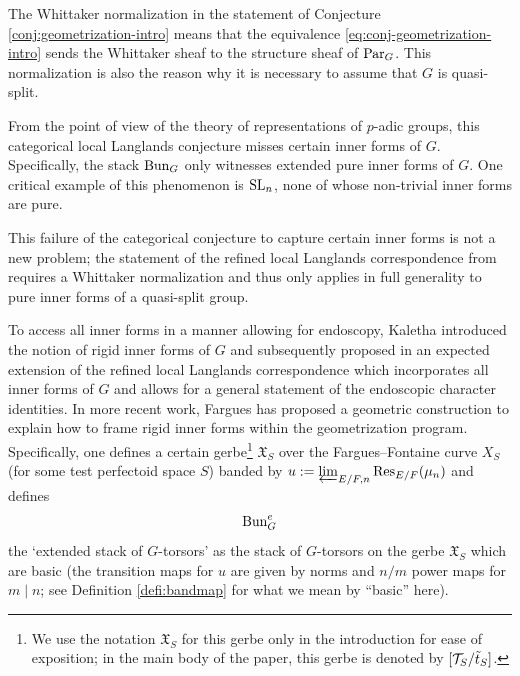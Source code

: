 The Whittaker normalization in the statement of Conjecture \ref{conj:geometrization-intro} means that the equivalence \eqref{eq:conj-geometrization-intro} sends the Whittaker sheaf to the structure sheaf of $\mathrm{Par}_G$. This normalization is also the reason why it is necessary to assume that $G$ is quasi-split.

From the point of view of the theory of representations of $p$-adic groups, this categorical local Langlands conjecture misses certain inner forms of $G$. Specifically, the stack $\mathrm{Bun}_G$ only witnesses extended pure inner forms of $G$. One critical example of this phenomenon is $\mathrm{SL}_n$, none of whose non-trivial inner forms are pure. 

This failure of the categorical conjecture to capture certain inner forms is not a new problem; the statement of the refined local Langlands correspondence from \cite{Vog93} requires a Whittaker normalization and thus only applies in full generality to pure inner forms of a quasi-split group. 

To access all inner forms in a manner allowing for endoscopy, Kaletha \cite{Kal16} introduced the notion of rigid inner forms of $G$ and subsequently proposed in \cite[\S 5.4]{Kal16} an expected extension of the refined local Langlands correspondence which incorporates all inner forms of $G$ and allows for a general statement of the endoscopic character identities. In more recent work, Fargues \cite{Fargues22} has proposed a geometric construction to explain how to frame rigid inner forms within the geometrization program. Specifically, one defines a certain gerbe\footnote{We use the notation $\mathfrak{X}_{S}$ for this gerbe only in the introduction for ease of exposition; in the main body of the paper, this gerbe is denoted by $[\mathcal{T}_{S}/\tilde{t}_{S}]$.} $\mathfrak{X}_{S}$ over the Fargues--Fontaine curve $X_S$ (for some test perfectoid space $S$) banded by $u := \varprojlim_{E/F,n} \mathrm{Res}_{E/F}(\mu_{n})$ and defines 
$$\mathrm{Bun}_G^e$$
the `extended stack of $G$-torsors' as the stack of $G$-torsors on the gerbe $\mathfrak{X}_{S}$ which are basic (the transition maps for $u$ are given by norms and $n/m$ power maps for $m \mid n$; see Definition \ref{defi:bandmap} for what we mean by ``basic'' here).  

